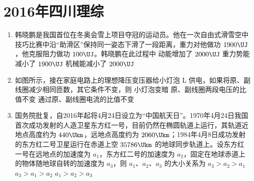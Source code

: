 \documentclass[\gkver]{gaokaozhenti}
\begin{document}
\chapter{2016年四川理综}

\begin{enumerate}
\item
韩晓鹏是我国首位在冬奥会雪上项目夺冠的运动员。他在一次自由式滑雪空中技巧比赛中沿“助滑区”保持同一姿态下滑了一段距离，重力对他做功 $1900\UJ$，他克服阻力做功 $100\UJ$。韩晓鹏在此过程中
{动能增加了 $2000\UJ$}
{重力势能减小了 $1900\UJ$}
{机械能减小了 $2000\UJ$}

\item
如图所示，接在家庭电路上的理想降压变压器给小灯泡 L 供电，如果将原、副线圈减少相同匝数，其它条件不变，则
\onepicture[w=2.98cm]{}
{小灯泡变暗}
{原、副线圈两段电压的比值不变}
{通过原、副线圈电流的比值不变}

\item
国务院批复，自2016年起将4月24日设立为“中国航天日”。1970年4月24日我国首次成功发射的人造卫星东方红一号，目前仍然在椭圆轨道上运行，其轨道近地点高度约为 $440\Ukm$，远地点高度约为 $2060\Ukm$；1984年4月8日成功发射的东方红二号卫星运行在赤道上空 $35786\Ukm$ 的地球同步轨道上。设东方红一号在远地点的加速度为 $a_{1}$，东方红二号的加速度为 $a_{2}$，固定在地球赤道上的物体随地球自转的加速度为 $a_{3}$，则 $a_{1}$、$a_{2}$、$a_{3}$ 的大小关系为
{$a_{3}>a_{2}>a_{1}$}
{$a_{3}>a_{1}>a_{2}$}
{$a_{1}>a_{2}>a_{3}$}


\end{enumerate}
\end{document}
